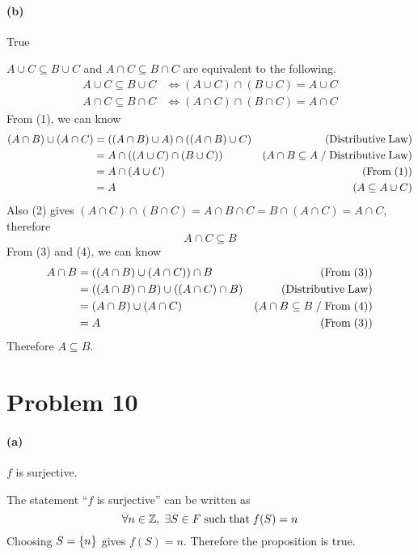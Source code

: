 \documentclass[10pt]{article}
\begin{document}
\paragraph{(b)} True

\vspace{0.3cm} $A\cup C \subseteq B\cup C$ and $A\cap C \subseteq B\cap C$ are equivalent to the following.
\begin{align}
  A\cup C \subseteq B\cup C &\Leftrightarrow (A\cup C) \cap (B\cup C) = A \cup C \\
  A\cap C \subseteq B\cap C &\Leftrightarrow (A\cap C) \cap (B\cap C) = A \cap C
\end{align}
From (1), we can know
\begin{align}
  (A \cap B) \cup (A \cap C) &= \qty((A \cap B) \cup A) \cap \qty((A \cap B) \cup C) &(\rm Distributive \; Law) \nonumber \\
  &= A \cap \qty((A \cup C) \cap (B \cup C)) &(A \cap B \subseteq A \; / \; \rm Distributive \; Law) \nonumber \\
  &= A \cap (A \cup C) &(\rm From \; (1)) \nonumber \\
  &= A &(A \subseteq A \cup C)
\end{align}
Also (2) gives $(A\cap C) \cap (B\cap C) = A \cap B \cap C = B \cap (A \cap C) = A \cap C$, therefore 
\begin{equation}
  A \cap C \subseteq B
\end{equation}
From (3) and (4), we can know
\begin{align*}
  A \cap B &= \qty((A \cap B) \cup (A \cap C)) \cap B &(\rm From \; (3))\\
  &= \qty((A \cap B) \cap B) \cup \qty((A \cap C) \cap B) & (\rm Distributive \; Law) \\
  &= (A \cap B) \cup (A \cap C) &(A \cap B \subseteq B \; / \; \rm From \; (4)) \\
  &= A &(\rm From \; (3))
\end{align*}
Therefore $A \subseteq B$. 

\section*{Problem 10}
\paragraph{(a)} $f$ is surjective.

\vspace{0.3cm} The statement ``$f$ is surjective'' can be written as
$$\forall n \in \mathbb{Z}, \; \exists S \in F {\rm \; such \; that \;} f(S) = n$$
Choosing $S = \qty{n}$ gives $f(S) = n$. Therefore the proposition is true.
\end{document}
